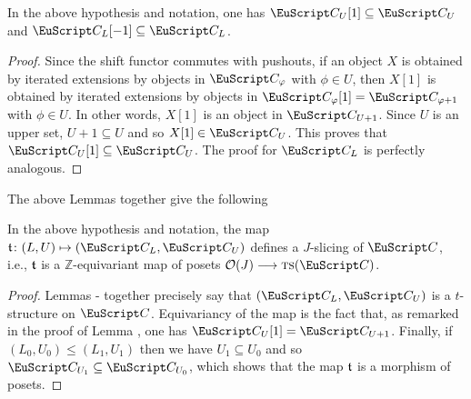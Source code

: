 \begin{lemma}\label{tre}
In the above hypothesis and notation, one has $\C_U[1]\subseteq \C_U$ and $\C_L[-1]\subseteq\C_L$.
\end{lemma}
\begin{proof}
Since the shift functor commutes with pushouts, if an object $X$ is obtained by iterated extensions by objects in $\C_\phi$ with $\phi\in U$, then $X[1]$ is obtained by iterated extensions by objects in $\C_\phi[1]=\C_{\phi+1}$ with $\phi\in U$. In other words, $X[1]$ is an object in $\C_{U+1}$. Since $U$ is an upper set, $U+1\subseteq U$ and so $X[1]\in \C_U$. This proves that $\C_U[1]\subseteq \C_U$. The proof for $\C_L$ is perfectly analogous. 
\end{proof}
The above Lemmas together give the following
\begin{proposition}
In the above hypothesis and notation, the map $\tee\colon (L,U)\mapsto (\C_L,\C_U)$ defines a $J$-slicing of $\C$, i.e., $\mathfrak{t}$ is a $\mathbb{Z}$-equivariant map of posets $\mathcal{O}(J)\to \ts(\C)$. 
\end{proposition}
\begin{proof}
Lemmas - together precisely say that $(\C_L,\C_U)$ is a $t$-structure on $\C$. Equivariancy of the map is the fact that, as remarked in the proof of Lemma , one has $\C_U[1]=\C_{U+1}$. Finally, if $(L_0,U_0)\leq (L_1,U_1)$ then we have $U_1\subseteq U_0$ and so $\C_{U_1}\subseteq \C_{U_0}$, which shows that the map $\mathfrak{t}$ is a morphism of posets.
\end{proof}

